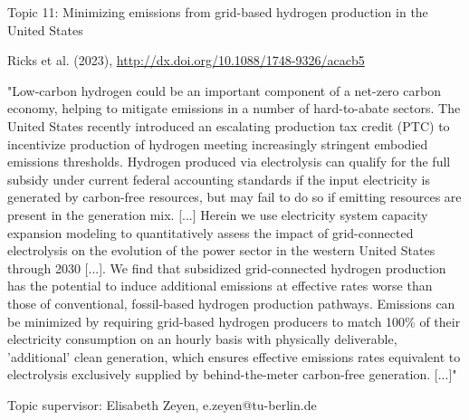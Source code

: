 \documentclass[10pt,aspectratio=169,dvipsnames]{beamer}
\begin{document}
\begin{frame}
  \begin{block}{Topic 11: Minimizing emissions from grid-based hydrogen production in the United States}
      
     Ricks et al. (2023), 
    \href{http://dx.doi.org/10.1088/1748-9326/acacb5}
    {http://dx.doi.org/10.1088/1748-9326/acacb5}
    
    "Low-carbon hydrogen could be an important component of a net-zero carbon economy, helping to mitigate emissions in a number of hard-to-abate sectors. The United States recently introduced an escalating production tax credit (PTC) to incentivize production of hydrogen meeting increasingly stringent embodied emissions thresholds. Hydrogen produced via electrolysis can qualify for the full subsidy under current federal accounting standards if the input electricity is generated by carbon-free resources, but may fail to do so if emitting resources are present in the generation mix. [...] Herein we use electricity system capacity expansion modeling to quantitatively assess the impact of grid-connected electrolysis on the evolution of the power sector in the western United States through 2030 [...]. We find that subsidized grid-connected hydrogen production has the potential to induce additional emissions at effective rates worse than those of conventional, fossil-based hydrogen production pathways. Emissions can be minimized by requiring grid-based hydrogen producers to match 100\% of their electricity consumption on an hourly basis with physically deliverable, 'additional' clean generation, which ensures effective emissions rates equivalent to electrolysis exclusively supplied by behind-the-meter carbon-free generation. [...]"

    \hfill
    Topic supervisor: Elisabeth Zeyen, e.zeyen@tu-berlin.de
    
  \end{block}
\end{frame}
\end{document}

